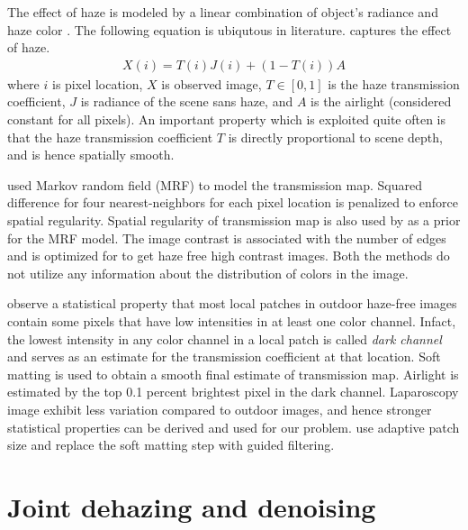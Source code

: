 The effect of haze is modeled by a linear combination of object's radiance and haze color \cite{koschmieder1925smokemodel}. The following equation is ubiqutous in literature.  captures the effect of haze.
\begin{align}
    X(i) = T(i) J(i) + (1 - T(i)) A \label{eqn:hazemodel}
\end{align}
where $i$ is pixel location, $X$ is observed image, $T \in [0, 1]$ is the haze transmission coefficient, $J$ is radiance of the scene sans haze, and $A$ is the airlight (considered constant for all pixels). An important property which is exploited quite often is that the haze transmission coefficient $T$ is directly proportional to scene depth, and is hence spatially smooth.

\cite{fattal2008single} used Markov random field (MRF) to model the transmission map. Squared difference for four nearest-neighbors for each pixel location is penalized to enforce spatial regularity. Spatial regularity of transmission map is also used by \cite{tan2008visibility} as a prior for the MRF model. The image contrast is associated with the number of edges and is optimized for to get haze free high contrast images. Both the methods do not utilize any information about the distribution of colors in the image.

\cite{he2011dark} observe a statistical property that most local patches in outdoor haze-free images contain some pixels that have low intensities in at least one color channel. Infact, the lowest intensity in any color channel in a local patch is called \textit{dark channel} and serves as an estimate for the transmission coefficient at that location. Soft matting is used to obtain a smooth final estimate of transmission map. Airlight is estimated by the top 0.1 percent brightest pixel in the dark channel. Laparoscopy image exhibit less variation compared to outdoor images, and hence stronger statistical properties can be derived and used for our problem. \cite{pang2011improved} use adaptive patch size and replace the soft matting step with guided filtering.

\section{Joint dehazing and denoising}














